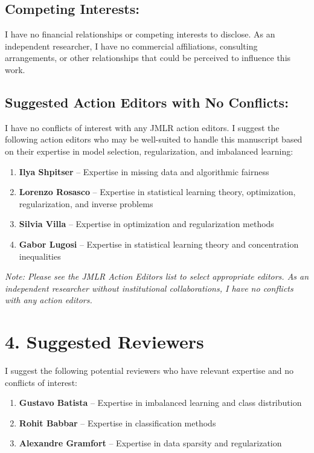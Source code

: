 \documentclass[11pt]{article}
\begin{document}
\subsection*{Competing Interests:}
I have no financial relationships or competing interests to disclose. As an independent researcher, I have no commercial affiliations, consulting arrangements, or other relationships that could be perceived to influence this work.

\subsection*{Suggested Action Editors with No Conflicts:}
I have no conflicts of interest with any JMLR action editors. I suggest the following action editors who may be well-suited to handle this manuscript based on their expertise in model selection, regularization, and imbalanced learning:

\begin{enumerate}
    \item \textbf{Ilya Shpitser} -- Expertise in missing data and algorithmic fairness
    \item \textbf{Lorenzo Rosasco} -- Expertise in statistical learning theory, optimization, regularization, and inverse problems
    \item \textbf{Silvia Villa} -- Expertise in optimization and regularization methods
    \item \textbf{Gabor Lugosi} -- Expertise in statistical learning theory and concentration inequalities
\end{enumerate}

\textit{Note: Please see the JMLR Action Editors list to select appropriate editors. As an independent researcher without institutional collaborations, I have no conflicts with any action editors.}

\section*{4. Suggested Reviewers}

I suggest the following potential reviewers who have relevant expertise and no conflicts of interest:

\begin{enumerate}
\item \textbf{Gustavo Batista} -- Expertise in imbalanced learning and class distribution
\item \textbf{Rohit Babbar} -- Expertise in classification methods
\item \textbf{Alexandre Gramfort} -- Expertise in data sparsity and regularization
\end{enumerate}
\end{document}
